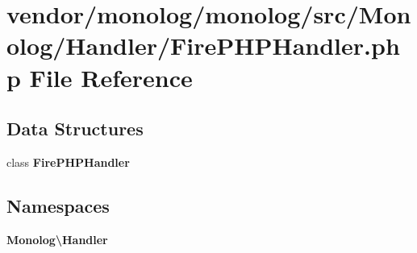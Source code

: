 \section{vendor/monolog/monolog/src/\+Monolog/\+Handler/\+Fire\+P\+H\+P\+Handler.php File Reference}
\label{_fire_p_h_p_handler_8php}
\subsection*{Data Structures}
\begin{DoxyCompactItemize}
\item 
class {\bf Fire\+P\+H\+P\+Handler}
\end{DoxyCompactItemize}
\subsection*{Namespaces}
\begin{DoxyCompactItemize}
\item 
 {\bf Monolog\textbackslash{}\+Handler}
\end{DoxyCompactItemize}
